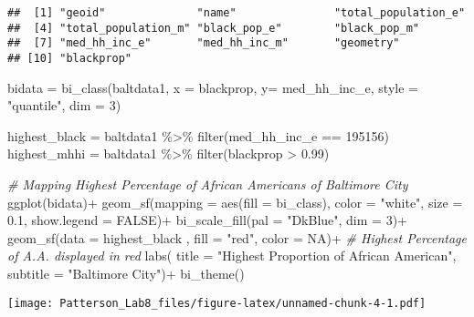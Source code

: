 \documentclass[
]{article}
\newenvironment{Shaded}{\begin{snugshade}}{\end{snugshade}}
\newcommand{\AttributeTok}[1]{\textcolor[rgb]{0.77,0.63,0.00}{#1}}
\newcommand{\CommentTok}[1]{\textcolor[rgb]{0.56,0.35,0.01}{\textit{#1}}}
\newcommand{\ConstantTok}[1]{\textcolor[rgb]{0.00,0.00,0.00}{#1}}
\newcommand{\DecValTok}[1]{\textcolor[rgb]{0.00,0.00,0.81}{#1}}
\newcommand{\FloatTok}[1]{\textcolor[rgb]{0.00,0.00,0.81}{#1}}
\newcommand{\FunctionTok}[1]{\textcolor[rgb]{0.00,0.00,0.00}{#1}}
\newcommand{\NormalTok}[1]{#1}
\newcommand{\OtherTok}[1]{\textcolor[rgb]{0.56,0.35,0.01}{#1}}
\newcommand{\SpecialCharTok}[1]{\textcolor[rgb]{0.00,0.00,0.00}{#1}}
\newcommand{\StringTok}[1]{\textcolor[rgb]{0.31,0.60,0.02}{#1}}
\begin{document}
\begin{verbatim}
##  [1] "geoid"              "name"               "total_population_e"
##  [4] "total_population_m" "black_pop_e"        "black_pop_m"       
##  [7] "med_hh_inc_e"       "med_hh_inc_m"       "geometry"          
## [10] "blackprop"
\end{verbatim}

\begin{Shaded}
\begin{Highlighting}[]
\NormalTok{bidata }\OtherTok{=} \FunctionTok{bi\_class}\NormalTok{(baltdata1, }\AttributeTok{x =}\NormalTok{ blackprop, }\AttributeTok{y=}\NormalTok{ med\_hh\_inc\_e, }\AttributeTok{style =} \StringTok{"quantile"}\NormalTok{, }\AttributeTok{dim =} \DecValTok{3}\NormalTok{)}

\NormalTok{highest\_black }\OtherTok{=}\NormalTok{ baltdata1 }\SpecialCharTok{\%\textgreater{}\%} \FunctionTok{filter}\NormalTok{(med\_hh\_inc\_e }\SpecialCharTok{==} \DecValTok{195156}\NormalTok{)}
\NormalTok{highest\_mhhi }\OtherTok{=}\NormalTok{ baltdata1 }\SpecialCharTok{\%\textgreater{}\%} \FunctionTok{filter}\NormalTok{(blackprop }\SpecialCharTok{\textgreater{}} \FloatTok{0.99}\NormalTok{)}

\CommentTok{\# Mapping Highest Percentage of African Americans of Baltimore City}
\FunctionTok{ggplot}\NormalTok{(bidata)}\SpecialCharTok{+}
  \FunctionTok{geom\_sf}\NormalTok{(}\AttributeTok{mapping =} \FunctionTok{aes}\NormalTok{(}\AttributeTok{fill =}\NormalTok{ bi\_class), }\AttributeTok{color =} \StringTok{"white"}\NormalTok{, }\AttributeTok{size =} \FloatTok{0.1}\NormalTok{, }\AttributeTok{show.legend =} \ConstantTok{FALSE}\NormalTok{)}\SpecialCharTok{+}
  \FunctionTok{bi\_scale\_fill}\NormalTok{(}\AttributeTok{pal =} \StringTok{"DkBlue"}\NormalTok{, }\AttributeTok{dim =} \DecValTok{3}\NormalTok{)}\SpecialCharTok{+}
  \FunctionTok{geom\_sf}\NormalTok{(}\AttributeTok{data =}\NormalTok{ highest\_black , }\AttributeTok{fill =} \StringTok{"red"}\NormalTok{, }\AttributeTok{color =} \ConstantTok{NA}\NormalTok{)}\SpecialCharTok{+} \CommentTok{\# Highest Percentage of A.A. displayed in red}
  \FunctionTok{labs}\NormalTok{(}
    \AttributeTok{title =} \StringTok{"Highest Proportion of African American"}\NormalTok{,}
    \AttributeTok{subtitle =} \StringTok{"Baltimore City"}\NormalTok{)}\SpecialCharTok{+}
  \FunctionTok{bi\_theme}\NormalTok{()}
\end{Highlighting}
\end{Shaded}

\texttt{[image: Patterson\_Lab8\_files/figure-latex/unnamed-chunk-4-1.pdf]}
\end{document}

